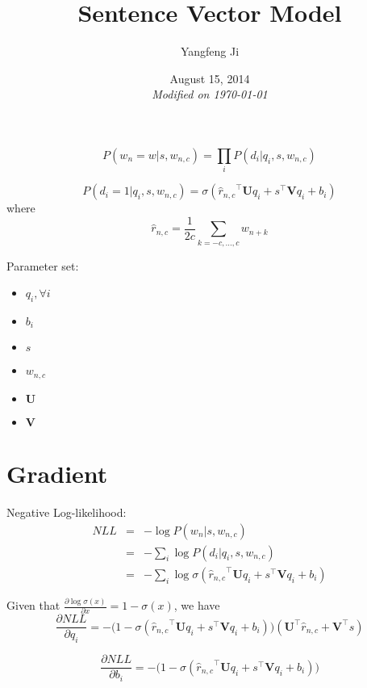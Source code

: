 \documentclass[12pt]{article}
\title{Sentence Vector Model}
\author{Yangfeng Ji}
\date{August 15, 2014\\ {\em Modified on \today}}
\newcommand{\trans}[1]{{#1}^{\top}}
\newcommand{\sigmoid}[1]{\sigma\left(#1\right)}
\newcommand{\ww}{\mathbf{U}}
\newcommand{\ws}{\mathbf{V}}
\begin{document}
 
\maketitle

\begin{equation}
  P(w_n=w|s, w_{n,c})=\prod_iP(d_i|q_i, s, w_{n,c})
\end{equation}

\begin{equation}
  P(d_i=1|q_i, s, w_{n,c})=\sigmoid{\trans{\hat{r}_{n,c}}\ww q_i + \trans{s}\ws q_i + b_i}
\end{equation}
where 
\begin{equation}
  \hat{r}_{n,c}=\frac{1}{2c}\sum_{k=-c,\dots,c}w_{n+k}
\end{equation}

Parameter set: 
\begin{itemize}
\item $q_i, \forall i$
\item $b_i$
\item $s$
\item $w_{n,c}$
\item $\ww$
\item $\ws$
\end{itemize}

\section{Gradient}
Negative Log-likelihood:
\begin{eqnarray}
  NLL &=& -\log P(w_n|s,w_{n,c})\\
  &=&-\sum_{i}\log P(d_i|q_i,s,w_{n,c})\\
  &=& -\sum_{i}\log\sigmoid{\trans{\hat{r}_{n,c}}\ww q_i + \trans{s}\ws q_i + b_i}
\end{eqnarray}

Given that $\frac{\partial\log\sigmoid{x}}{\partial x}=1-\sigmoid{x}$, we have 
\begin{equation}
  \frac{\partial NLL}{\partial q_i}=-\Big(1-\sigmoid{\trans{\hat{r}_{n,c}}\ww q_i + \trans{s}\ws q_i + b_i}\Big)
  \left(
    \trans{\ww}\hat{r}_{n,c} + \trans{\ws}s
  \right)
\end{equation}

\begin{equation}
  \frac{\partial NLL}{\partial b_i}=-\Big(1-\sigmoid{\trans{\hat{r}_{n,c}}\ww q_i + \trans{s}\ws q_i + b_i}\Big)
\end{equation}
\end{document}
